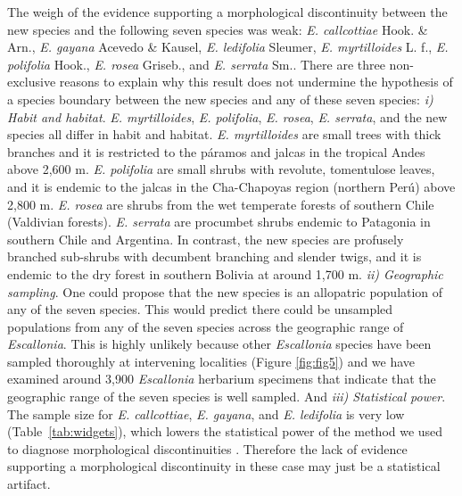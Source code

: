 \documentclass[fleqn,10pt,lineno]{wlpeerj} %
\begin{document}
The weigh of the evidence supporting a morphological discontinuity between the new species and the following seven species was weak: \emph{E. callcottiae} Hook. \& Arn., \emph{E. gayana} Acevedo \& Kausel, \emph{E. ledifolia} Sleumer, \emph{E. myrtilloides} L. f., \emph{E. polifolia} Hook., \emph{E. rosea} Griseb., and \emph{E. serrata} Sm.. There are three non-exclusive reasons to explain why this result does not undermine the hypothesis of a species boundary between the new species and any of these seven species: \textit{i) Habit and habitat}. \emph{E. myrtilloides}, \emph{E. polifolia}, \emph{E. rosea}, \emph{E. serrata}, and the new species all differ in habit and habitat. \emph{E. myrtilloides} are small trees with thick branches and it is restricted to the páramos and jalcas in the tropical Andes above 2,600 m. \emph{E. polifolia} are small shrubs with revolute, tomentulose leaves, and it is endemic to the jalcas in the Cha-Chapoyas region (northern Perú) above 2,800 m. \emph{E. rosea} are shrubs from the wet temperate forests of southern Chile (Valdivian forests). \emph{E. serrata} are procumbet shrubs endemic to Patagonia in southern Chile and Argentina. In contrast, the new species are profusely branched sub-shrubs with decumbent branching and slender twigs, and it is endemic to the dry forest in southern Bolivia at around 1,700 m. \textit{ii) Geographic sampling}. One could propose that the new species is an allopatric population of any of the seven species. This would predict there could be unsampled populations from any of the seven species across the geographic range of \emph{Escallonia}. This is highly unlikely because other \emph{Escallonia} species have been sampled thoroughly at intervening localities (Figure \ref{fig:fig5}) and we have examined around 3,900 \emph{Escallonia} herbarium specimens that indicate that the geographic range of the seven species is well sampled. And \textit{iii) Statistical power}. The sample size for \emph{E. callcottiae}, \emph{E. gayana}, and \emph{E. ledifolia} is very low (Table~\ref{tab:widgets}), which lowers the statistical power of the method we used to diagnose morphological discontinuities \citep{Zapata:2012it}. Therefore the lack of evidence supporting a morphological discontinuity in these case may just be a statistical artifact. 
\end{document}
